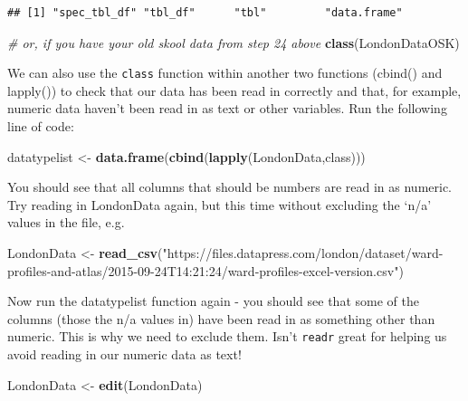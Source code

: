 \documentclass[]{book}
\newenvironment{Shaded}{\begin{snugshade}}{\end{snugshade}}
\newcommand{\CommentTok}[1]{\textcolor[rgb]{0.56,0.35,0.01}{\textit{#1}}}
\newcommand{\KeywordTok}[1]{\textcolor[rgb]{0.13,0.29,0.53}{\textbf{#1}}}
\newcommand{\NormalTok}[1]{#1}
\newcommand{\StringTok}[1]{\textcolor[rgb]{0.31,0.60,0.02}{#1}}
\begin{document}
\begin{verbatim}
## [1] "spec_tbl_df" "tbl_df"      "tbl"         "data.frame"
\end{verbatim}

\begin{Shaded}
\begin{Highlighting}[]
\CommentTok{# or, if you have your old skool data from step 24 above}
\KeywordTok{class}\NormalTok{(LondonDataOSK)}
\end{Highlighting}
\end{Shaded}

We can also use the \texttt{class} function within another two functions (cbind() and lapply()) to check that our data has been read in correctly and that, for example, numeric data haven't been read in as text or other variables. Run the following line of code:

\begin{Shaded}
\begin{Highlighting}[]
\NormalTok{datatypelist <-}\StringTok{ }\KeywordTok{data.frame}\NormalTok{(}\KeywordTok{cbind}\NormalTok{(}\KeywordTok{lapply}\NormalTok{(LondonData,class)))}
\end{Highlighting}
\end{Shaded}

You should see that all columns that should be numbers are read in as numeric. Try reading in LondonData again, but this time without excluding the `n/a' values in the file, e.g.

\begin{Shaded}
\begin{Highlighting}[]
\NormalTok{LondonData <-}\StringTok{ }\KeywordTok{read_csv}\NormalTok{(}\StringTok{"https://files.datapress.com/london/dataset/ward-profiles-and-atlas/2015-09-24T14:21:24/ward-profiles-excel-version.csv"}\NormalTok{)}
\end{Highlighting}
\end{Shaded}

Now run the datatypelist function again - you should see that some of the columns (those the n/a values in) have been read in as something other than numeric. This is why we need to exclude them. Isn't \texttt{readr} great for helping us avoid reading in our numeric data as text!

\begin{Shaded}
\begin{Highlighting}[]
\NormalTok{LondonData <-}\StringTok{ }\KeywordTok{edit}\NormalTok{(LondonData)}
\end{Highlighting}
\end{Shaded}
\end{document}
